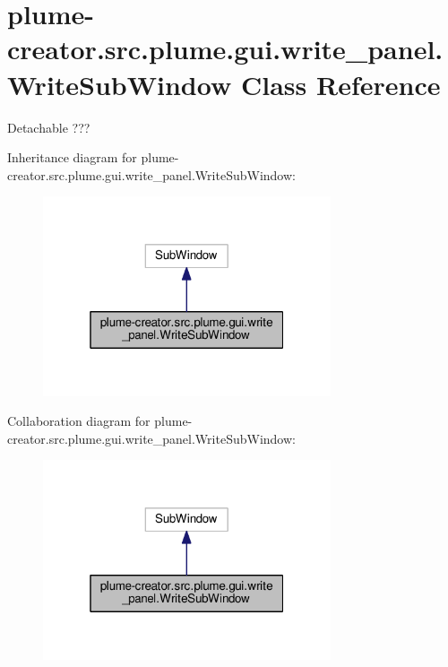 \hypertarget{classplume-creator_1_1src_1_1plume_1_1gui_1_1write__panel_1_1_write_sub_window}{}\section{plume-\/creator.src.\+plume.\+gui.\+write\+\_\+panel.\+Write\+Sub\+Window Class Reference}
\label{classplume-creator_1_1src_1_1plume_1_1gui_1_1write__panel_1_1_write_sub_window}


Detachable ???  




Inheritance diagram for plume-\/creator.src.\+plume.\+gui.\+write\+\_\+panel.\+Write\+Sub\+Window\+:\nopagebreak
\begin{figure}[H]
\begin{center}
\leavevmode
\includegraphics[width=241pt]{classplume-creator_1_1src_1_1plume_1_1gui_1_1write__panel_1_1_write_sub_window__inherit__graph}
\end{center}
\end{figure}


Collaboration diagram for plume-\/creator.src.\+plume.\+gui.\+write\+\_\+panel.\+Write\+Sub\+Window\+:\nopagebreak
\begin{figure}[H]
\begin{center}
\leavevmode
\includegraphics[width=241pt]{classplume-creator_1_1src_1_1plume_1_1gui_1_1write__panel_1_1_write_sub_window__coll__graph}
\end{center}
\end{figure}
